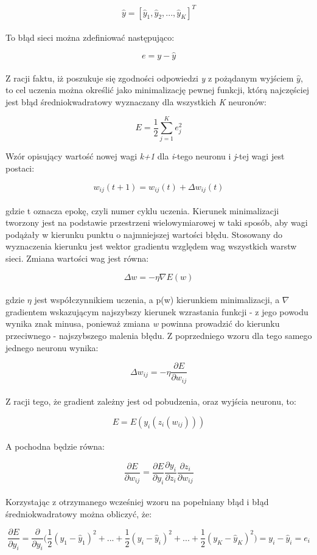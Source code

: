 \documentclass[a4paper, 12pt]{report}
\begin{document}
$$\widehat{y} = [\widehat{y}_1, \widehat{y}_2, ..., \widehat{y}_K]^{T} $$\\
To błąd sieci można zdefiniować następująco:

$$e = y - \widehat{y}$$\\
Z racji faktu, iż poszukuje się zgodności odpowiedzi \textit{y} z pożądanym wyjściem $\widehat{y}$, to cel uczenia można określić jako minimalizację pewnej funkcji, którą najczęściej jest błąd średniokwadratowy wyznaczany dla wszystkich \textit{K} neuronów:

$$E = \frac{1}{2} {\sum_{j=1}^{K}  e^{2}_j}$$

Wzór opisujący wartość nowej wagi \textit{k+1} dla \textit{i}-tego neuronu i \textit{j}-tej wagi jest postaci: 

$$w_{ij}(t + 1) = w_{ij}(t) + \Delta w_{ij}(t)$$\\
gdzie t oznacza epokę, czyli numer cyklu uczenia. Kierunek minimalizacji tworzony jest na podstawie przestrzeni wielowymiarowej w taki sposób, aby wagi podążały w kierunku punktu o najmniejszej wartości błędu. Stosowany do wyznaczenia kierunku jest wektor gradientu względem wag wszystkich warstw sieci. Zmiana wartości wag jest równa: 

$$\Delta w = - \eta \nabla E(w)$$\\
gdzie $\eta$ jest współczynnikiem uczenia, a p(w) kierunkiem minimalizacji, a $\nabla$ gradientem wskazującym najszybszy kierunek wzrastania funkcji - z jego powodu wynika znak minusa, ponieważ zmiana \textit{w} powinna prowadzić do kierunku przeciwnego - najszybszego malenia błędu. Z poprzedniego wzoru dla tego samego jednego neuronu wynika:

$$\Delta w_{ij} = - \eta \frac{\partial E}{\partial w_{ij}}$$\\
Z racji tego, że gradient zależny jest od pobudzenia, oraz wyjścia neuronu, to:

$$ E = E(y_i(z_i(w_{ij})))$$\\
A pochodna będzie równa:

$$\frac{\partial E}{\partial w_{ij}} = \frac{\partial E}{\partial y_i} \frac{\partial y_i}{\partial z_i} \frac{\partial z_i}{\partial w_{ij}}$$\\
Korzystając z otrzymanego wcześniej wzoru na popełniany błąd i błąd średniokwadratowy można obliczyć, że:

\[ \frac{\partial E}{\partial y_i} = \frac{\partial}{\partial y_{i}} \Big( \frac{1}{2} (y_1 - \widehat{y}_1)^{2} + ... + \frac{1}{2} (y_i - \widehat{y}_i)^{2} + ... + \frac{1}{2} (y_K - \widehat{y}_K)^{2} \Big) =  y_i - \widehat{y}_i = e_i\] \\
\end{document}
